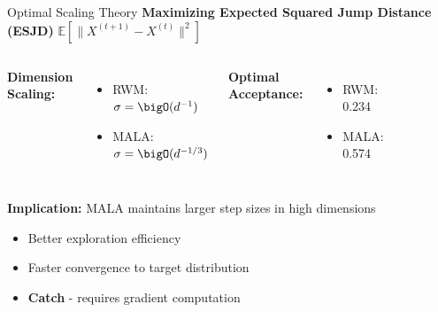 \begin{frame}{Optimal Scaling Theory}
	\textbf{Maximizing Expected Squared Jump Distance (ESJD)}
	$\mathbb{E}\left[\|X^{(t+1)} - X^{(t)}\|^2\right]$

	\begin{columns}
		\textbf{Dimension Scaling:}
		\begin{itemize}
			\item RWM: $\sigma = \bigO(d^{-1})$
			\item \textcolor{copenhagenred}{MALA: $\sigma = \bigO(d^{-1/3})$}
		\end{itemize}

		\vspace{0.5em}

		\textbf{Optimal Acceptance:}
		\begin{itemize}
			\item RWM: 0.234
			\item \textcolor{copenhagenred}{MALA: 0.574}
		\end{itemize}
		\begin{figure}
			\centering
			\includegraphics[width=0.6\textwidth]{barker.jpg}
		\end{figure}
	\end{columns}

	\vspace{1em}

	\textbf{Implication:} MALA maintains larger step sizes in high dimensions
	\begin{itemize}
		\item Better exploration efficiency
		\item Faster convergence to target distribution
		\item \textbf{Catch} - requires gradient computation
	\end{itemize}
\end{frame}

